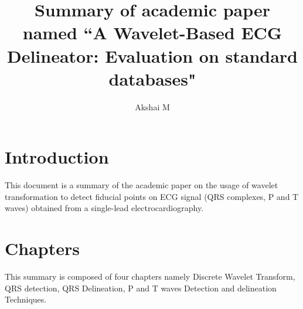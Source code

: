 \documentclass[twocolumn,showpacs,%
  nofootinbib,aps,superscriptaddress,%
  eqsecnum,prd,notitlepage,showkeys,10pt]{revtex4-1}
\begin{document}
\title{Summary of academic paper named ``A Wavelet-Based ECG Delineator: Evaluation on standard databases" }
\author{Akshai M}



\maketitle

\section{Introduction}
This document is a summary of the academic paper on the usage of wavelet transformation to detect fiducial points on ECG signal (QRS complexes, P and T waves) obtained from a single-lead electrocardiography.
\section{Chapters}
This summary is composed of four chapters namely Discrete Wavelet Transform, QRS detection, QRS Delineation, P and T waves Detection and delineation Techniques.
\label{sec:examples}
\end{document}
